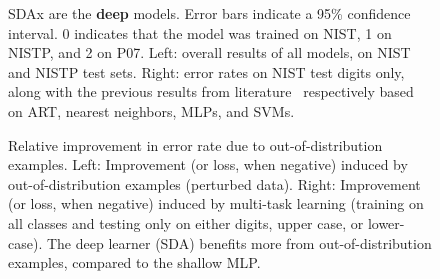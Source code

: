 \documentclass{article} %
\begin{document}

\begin{figure}[ht]
\centerline{}
\caption{SDAx are the {\bf deep} models. Error bars indicate a 95\% confidence interval. 0 indicates that the model was trained
on NIST, 1 on NISTP, and 2 on P07. Left: overall results
of all models, on NIST and NISTP test sets.
Right: error rates on NIST test digits only, along with the previous results from 
literature~\citep{Granger+al-2007,Cortes+al-2000-small,Oliveira+al-2002-short,Milgram+al-2005}
respectively based on ART, nearest neighbors, MLPs, and SVMs.}
\label{fig:error-rates-charts}
\end{figure}


\begin{figure}[ht]
\vspace*{-3mm}
\centerline{}
\vspace*{-3mm}
\caption{Relative improvement in error rate due to out-of-distribution examples.
Left: Improvement (or loss, when negative)
induced by out-of-distribution examples (perturbed data). 
Right: Improvement (or loss, when negative) induced by multi-task 
learning (training on all classes and testing only on either digits,
upper case, or lower-case). The deep learner (SDA) benefits more from
out-of-distribution examples, compared to the shallow MLP.}
\label{fig:improvements-charts}
\vspace*{-2mm}
\end{figure}
\end{document}
